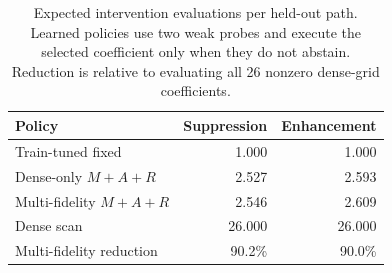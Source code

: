 \begin{table}[t]
\centering
\small
\caption{Expected intervention evaluations per held-out path. Learned policies
use two weak probes and execute the selected coefficient only when they do not
abstain. Reduction is relative to evaluating all 26 nonzero dense-grid
coefficients.}
\label{tab:strength-efficiency}
\begin{tabular}{lrr}
\toprule
Policy & Suppression & Enhancement \\
\midrule
Train-tuned fixed & 1.000 & 1.000 \\
Dense-only $M+A+R$ & 2.527 & 2.593 \\
Multi-fidelity $M+A+R$ & 2.546 & 2.609 \\
Dense scan & 26.000 & 26.000 \\
\midrule
Multi-fidelity reduction & 90.2\% & 90.0\% \\
\bottomrule
\end{tabular}

\end{table}
